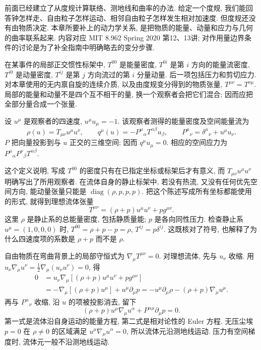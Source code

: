 \label{gr-ch-field}

前面已经建立了从度规计算联络、测地线和曲率的办法. 给定一个度规, 我们能回答钟怎样走、自由粒子怎样运动、相邻自由粒子怎样发生相对加速度. 但度规还没有由物质决定. 本章所要补上的动力学关系, 是把物质的能量、动量和应力与几何的曲率联系起来. 内容对应 MIT 8.962 Spring 2020 第12、13讲; 对作用量边界条件的讨论是为了补全指南中明确略去的变分步骤.


在某事件的局部正交惯性标架中, $T^{00}$ 是能量密度, $T^{0i}$ 是第 $i$ 方向的能量流密度, $T^{i0}$ 是动量密度, $T^{ij}$ 是第 $j$ 方向流过的第 $i$ 分量动量. 后一项包括压力和剪切应力. 对本章使用的无内禀自旋的连续介质, 以及由度规变分得到的物质张量, $T^{\mu\nu}=T^{\nu\mu}$. 局部的能量和动量不是四个互不相干的量, 换一个观察者会把它们混合; 因而应把全部分量合成一个张量.

\begin{definition}
设 $u^\mu$ 是观察者的四速度, $u^\mu u_\mu=-1$. 该观察者测得的能量密度及空间能量流为
\[
 \rho(u)=T_{\mu\nu}u^\mu u^\nu,\qquad
 q^\mu(u)=-P^\mu{}_{\alpha}T^{\alpha\beta}u_\beta,
 \qquad P^\mu{}_{\nu}=\delta^\mu{}_{\nu}+u^\mu u_\nu.
\]
$P$ 把向量投影到与 $u$ 正交的三维空间; 因而 $q^\mu u_\mu=0$. 相应的空间应力为 $P^\mu{}_{\alpha}P^\nu{}_{\beta}T^{\alpha\beta}$.
\end{definition}

这个定义说明, 写成 $T^{00}$ 的密度只有在已指定坐标或标架后才有意义, 而 $T_{\mu\nu}u^\mu u^\nu$ 明确写出了所用观察者. 在流体自身的静止标架中, 若没有热流, 又没有任何优先空间方向, 能动量张量只能是 $\operatorname{diag}(\rho,p,p,p)$. 把这个陈述写成所有坐标都能使用的形式, 就得到理想流体张量
\begin{equation}\label{gr4-fluid}
 T^{\mu\nu}=(\rho+p)u^\mu u^\nu+p g^{\mu\nu}.
\end{equation}
这里 $\rho$ 是静止系的总能量密度, 包括静质量能; $p$ 是各向同性压力. 检查静止系 $u^\mu=(1,0,0,0)$ 时, $T^{00}=\rho+p-p=\rho$, $T^{ij}=p\delta^{ij}$. 这既核对了符号, 也解释了为什么四速度项的系数是 $\rho+p$ 而不是 $\rho$.

自由物质在弯曲背景上的局部守恒式为 $\nabla_\mu T^{\mu\nu}=0$. 对理想流体, 先与 $u_\nu$ 收缩. 用 $u_\nu\nabla_\mu u^\nu=\tfrac12\nabla_\mu(u_\nu u^\nu)=0$, 得
\begin{align*}
0&=u_\nu\nabla_\mu[(\rho+p)u^\mu u^\nu+p g^{\mu\nu}]\\
 &=-\nabla_\mu[(\rho+p)u^\mu]+u^\mu\partial_\mu p
 =-u^\mu\partial_\mu\rho-(\rho+p)\nabla_\mu u^\mu.
\end{align*}
再与 $P^\alpha{}_{\nu}$ 收缩, 沿 $u$ 的项被投影消去, 留下
\begin{equation}\label{gr4-euler}
 (\rho+p)u^\mu\nabla_\mu u^\alpha
   +P^{\alpha\mu}\partial_\mu p=0.
\end{equation}
第一式是流体沿自身运动的能量方程, 第二式是相对论性的 Euler 方程. 无压尘埃 $p=0$ 在 $\rho\ne0$ 的区域满足 $u^\mu\nabla_\mu u^\alpha=0$, 所以流体元沿测地线运动. 压力有空间梯度时, 流体元一般不沿测地线运动.


